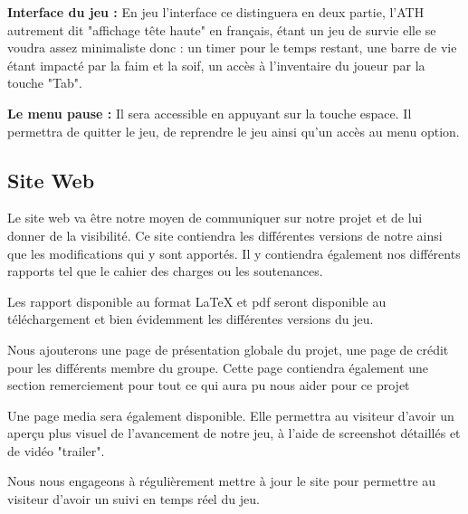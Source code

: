 \documentclass{article}
\begin{document}
\par

\textbf{Interface du jeu :} En jeu l'interface ce distinguera en deux partie, l'ATH autrement dit "affichage tête haute" en français, étant un jeu de survie elle se voudra assez minimaliste donc : un timer pour le temps restant, une barre de vie étant impacté par la faim et la soif, un accès à l'inventaire du joueur par la touche "Tab". 
\newline

\par
\textbf{Le menu pause :} Il sera accessible en appuyant sur la touche espace. Il permettra de quitter le jeu, de reprendre le jeu ainsi qu'un accès au menu option.
\newline





\newpage
\subsection{Site Web}

\par
Le site web va être notre moyen de communiquer sur notre projet et de lui donner de la visibilité. Ce site contiendra les différentes versions de notre ainsi que les modifications qui y sont apportés. Il y contiendra également nos différents rapports tel que le cahier des charges ou les soutenances.
\newline

\par
Les rapport disponible au format LaTeX et pdf seront disponible au téléchargement et bien évidemment les différentes versions du jeu.
\newline

\par
Nous ajouterons une page de présentation globale du projet, une page de crédit pour les différents membre du groupe. Cette page contiendra également une section remerciement pour tout ce qui aura pu nous aider pour ce projet
\newline

\par
Une page media sera également disponible. Elle permettra au visiteur d'avoir un aperçu plus visuel de l'avancement de notre jeu, à l'aide de screenshot détaillés et de vidéo "trailer".
\newline

\par
Nous nous engageons à régulièrement mettre à jour le site pour permettre au visiteur d'avoir un suivi en temps réel du jeu.
\newline
\end{document}
